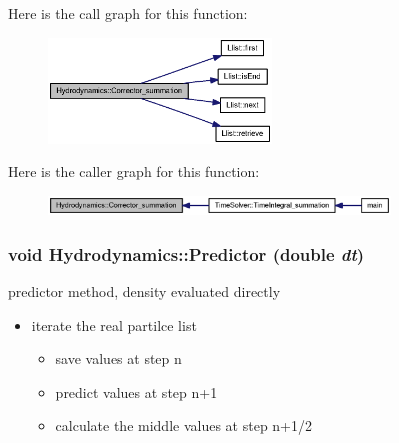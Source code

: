 Here is the call graph for this function:\nopagebreak
\begin{figure}[H]
\begin{center}
\leavevmode
\includegraphics[width=168pt]{classHydrodynamics_6a62dad5b8c33b504481a8e4e5b023cb_cgraph}
\end{center}
\end{figure}


Here is the caller graph for this function:\nopagebreak
\begin{figure}[H]
\begin{center}
\leavevmode
\includegraphics[width=257pt]{classHydrodynamics_6a62dad5b8c33b504481a8e4e5b023cb_icgraph}
\end{center}
\end{figure}
\hypertarget{classHydrodynamics_316a6079bf22102d9b911e2632cd2680}{
\subsubsection[{Predictor}]{\setlength{\rightskip}{0pt plus 5cm}void Hydrodynamics::Predictor (double {\em dt})}}
\label{classHydrodynamics_316a6079bf22102d9b911e2632cd2680}


predictor method, density evaluated directly 



\begin{itemize}
\item iterate the real partilce list

\begin{itemize}
\item save values at step n

\item predict values at step n+1

\item calculate the middle values at step n+1/2\end{itemize}
\end{itemize}



